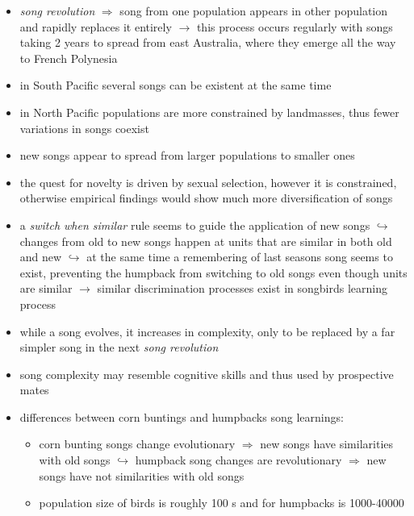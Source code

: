 \documentclass[12pt,a4paper]{article}
\begin{document}
\begin{itemize}
\begin{enumerate}
   \end{enumerate} 
   \item \textit{song revolution} $\Longrightarrow$ song from one population appears in other population and rapidly replaces it entirely
  \newline \indent $\longrightarrow$ this process occurs regularly with songs taking 2 years to spread from east Australia, where they emerge all the way to French Polynesia
  \item in South Pacific several songs can be existent at the same time
  \item in North Pacific populations are more constrained by landmasses, thus fewer variations in songs coexist
  \item new songs appear to spread from larger populations to smaller ones
  \item the quest for novelty is driven by sexual selection, however it is constrained, otherwise empirical findings would show much more diversification of songs
  \item a \textit{switch when similar} rule seems to guide the application of new songs
  \newline \indent $\hookrightarrow$ changes from old to new songs happen at units that are similar in both old and new
  \newline \indent $\hookrightarrow$ at the same time a remembering of last seasons song seems to exist, preventing the humpback from switching to old songs even though units are similar
  \newline \indent $\longrightarrow$ similar discrimination processes exist in songbirds learning process
  \item while a song evolves, it increases in complexity, only to be replaced by a far simpler song in the next \textit{song revolution}
  \item song complexity may resemble cognitive skills and thus used by prospective mates
  \item differences between corn buntings and humpbacks song learnings:
  \begin{itemize}
    \item corn bunting songs change evolutionary $\Longrightarrow$ new songs have similarities with old songs
    \newline \indent $\hookrightarrow$ humpback song changes are revolutionary $\Longrightarrow$ new songs have not similarities with old songs
    \item population size of birds is roughly 100 s and for humpbacks is 1000-40000

\end{itemize}
\end{itemize}
\end{document}
